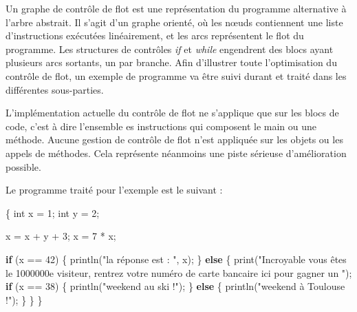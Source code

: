 \documentclass[
]{article}
\newenvironment{Shaded}{}{}
\newcommand{\ControlFlowTok}[1]{\textcolor[rgb]{0.00,0.44,0.13}{\textbf{#1}}}
\newcommand{\DataTypeTok}[1]{\textcolor[rgb]{0.56,0.13,0.00}{#1}}
\newcommand{\DecValTok}[1]{\textcolor[rgb]{0.25,0.63,0.44}{#1}}
\newcommand{\FunctionTok}[1]{\textcolor[rgb]{0.02,0.16,0.49}{#1}}
\newcommand{\NormalTok}[1]{#1}
\newcommand{\OperatorTok}[1]{\textcolor[rgb]{0.40,0.40,0.40}{#1}}
\newcommand{\StringTok}[1]{\textcolor[rgb]{0.25,0.44,0.63}{#1}}
\begin{document}
Un graphe de contrôle de flot est une représentation du programme
alternative à l'arbre abstrait. Il s'agit d'un graphe orienté, où les
nœuds contiennent une liste d'instructions exécutées linéairement, et
les arcs représentent le flot du programme. Les structures de contrôles
\emph{if} et \emph{while} engendrent des blocs ayant plusieurs arcs
sortants, un par branche. Afin d'illustrer toute l'optimisation du
contrôle de flot, un exemple de programme va être suivi durant et traité
dans les différentes sous-parties.

L'implémentation actuelle du contrôle de flot ne s'applique que sur les
blocs de code, c'est à dire l'ensemble es instructions qui composent le
main ou une méthode. Aucune gestion de contrôle de flot n'est appliquée
sur les objets ou les appels de méthodes. Cela représente néanmoins une
piste sérieuse d'amélioration possible.

Le programme traité pour l'exemple est le suivant :

\begin{Shaded}
\begin{Highlighting}[]
\OperatorTok{\{}
    \DataTypeTok{int}\NormalTok{ x }\OperatorTok{=} \DecValTok{1}\OperatorTok{;}
    \DataTypeTok{int}\NormalTok{ y }\OperatorTok{=} \DecValTok{2}\OperatorTok{;}

\NormalTok{    x }\OperatorTok{=}\NormalTok{ x }\OperatorTok{+}\NormalTok{ y }\OperatorTok{+} \DecValTok{3}\OperatorTok{;}
\NormalTok{    x }\OperatorTok{=} \DecValTok{7} \OperatorTok{*}\NormalTok{ x}\OperatorTok{;}

    \ControlFlowTok{if} \OperatorTok{(}\NormalTok{x }\OperatorTok{==} \DecValTok{42}\OperatorTok{)} \OperatorTok{\{}
        \FunctionTok{println}\OperatorTok{(}\StringTok{"la réponse est : "}\OperatorTok{,}\NormalTok{ x}\OperatorTok{);}
    \OperatorTok{\}}
    \ControlFlowTok{else} \OperatorTok{\{}
        \FunctionTok{print}\OperatorTok{(}\StringTok{"Incroyable vous êtes le 1000000e visiteur, rentrez votre numéro de carte bancaire ici pour gagner un "}\OperatorTok{);}
        \ControlFlowTok{if} \OperatorTok{(}\NormalTok{x }\OperatorTok{==} \DecValTok{38}\OperatorTok{)} \OperatorTok{\{}
            \FunctionTok{println}\OperatorTok{(}\StringTok{"weekend au ski !"}\OperatorTok{);}
        \OperatorTok{\}}
        \ControlFlowTok{else} \OperatorTok{\{}
            \FunctionTok{println}\OperatorTok{(}\StringTok{"weekend à Toulouse !"}\OperatorTok{);}
        \OperatorTok{\}}
    \OperatorTok{\}}
\OperatorTok{\}}
\end{Highlighting}
\end{Shaded}
\end{document}
